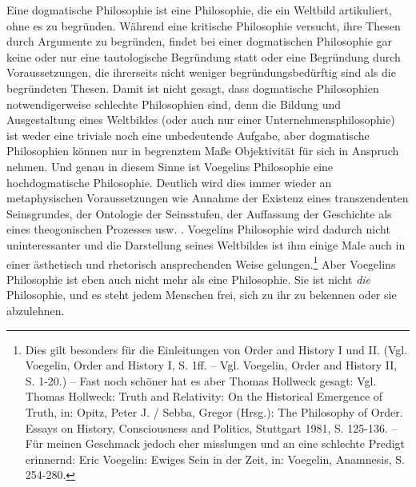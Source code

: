 Eine dogmatische Philosophie ist eine Philosophie, die ein Weltbild
artikuliert, ohne es zu begründen. Während eine kritische Philosophie
versucht, ihre Thesen durch Argumente zu begründen, findet bei einer
dogmatischen Philosophie gar keine oder nur eine tautologische Begründung
statt oder eine Begründung durch Voraussetzungen, die ihrerseits nicht weniger
begründungsbedürftig sind als die begründeten Thesen. Damit ist nicht gesagt,
dass dogmatische Philosophien notwendigerweise schlechte Philosophien sind,
denn die Bildung und Ausgestaltung eines Weltbildes (oder auch nur einer
Unternehmensphilosophie) ist weder eine triviale noch eine unbedeutende
Aufgabe, aber dogmatische Philosophien können nur in begrenztem Maße
Objektivität für sich in Anspruch nehmen. Und genau in diesem Sinne ist
Voegelins Philosophie eine hochdogmatische Philosophie. Deutlich wird dies
immer wieder an metaphysischen Voraussetzungen wie Annahme der Existenz eines
transzendenten Seinsgrundes, der Ontologie der Seinsstufen, der Auffassung der
Geschichte als eines theogonischen Prozesses usw. . Voegelins Philosophie wird
dadurch nicht uninteressanter und die Darstellung seines Weltbildes ist ihm
einige Male auch in einer ästhetisch und rhetorisch ansprechenden Weise
gelungen.\footnote{Dies gilt besonders für die Einleitungen von Order and
  History I und II. (Vgl. Voegelin, Order and History I, S. 1ff. -- Vgl.
  Voegelin, Order and History II, S. 1-20.) -- Fast noch schöner hat es aber
  Thomas Hollweck gesagt: Vgl. Thomas Hollweck: Truth and Relativity: On the
  Historical Emergence of Truth, in: Opitz, Peter J. / Sebba, Gregor (Hrsg.):
  The Philosophy of Order. Essays on History, Consciousness and Politics,
  Stuttgart 1981, S. 125-136. -- Für meinen Geschmack jedoch eher misslungen
  und an eine schlechte Predigt erinnernd: Eric Voegelin: Ewiges Sein in der
  Zeit, in: Voegelin, Anamnesis, S. 254-280.} Aber Voegelins Philosophie ist
eben auch nicht mehr als eine Philosophie. Sie ist nicht {\it die}
Philosophie, und es steht jedem Menschen frei, sich zu ihr zu bekennen oder
sie abzulehnen.

